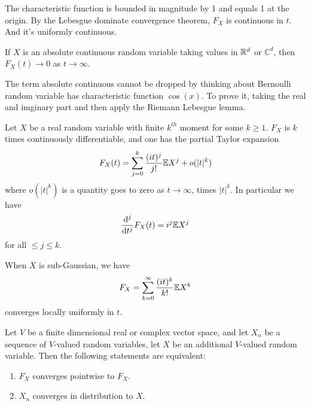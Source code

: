 The characteristic function is bounded in magnitude by 1 and equals 1 at the origin. By the Lebesgue dominate convergence theorem, $F_X$ is continuous in $t$. And it's uniformly continuous.

\begin{lemma}
    If $X$ is an absolute continuous random variable taking values in $\mathbb{R}^d$ or $\mathbb C^d$, then $F_X(t)\to 0$ as $t\to \infty$.
\end{lemma}

The term absolute continuous cannot be dropped by thinking about Bernoulli random  variable has characteristic function $\cos(x)$. To prove it, taking the real and imginary part and then apply the Riemann Lebesgue lemma. 

\begin{theorem}
    \label{taylor expansion of characteristic function}
    Let $X$ be a real random variable with finite $k^{th}$ moment for some $k\geq 1$. $F_X$ is $k$ times continuously differentiable, and one has the partial Taylor expansion
    \begin{equation*}
        F_X(t) = \sum_{j=0}^k \frac{(it)^j}{j!} \mathbb{E} X^j +o(|t|^k)
    \end{equation*}
    where $o(|t|^k)$ is a quantity goes to zero as $t\to \infty$, times $|t|^k$. In particular we have 
    \begin{equation*}
        \frac{\mathrm{d}^j}{\mathrm{d} t^j} F_X(t) = i^j \mathbb{E} X^j
    \end{equation*}
    for all $\leq j\leq k$.
\end{theorem}

When $X$ is sub-Gaussian, we have 
\begin{equation}
    F_X = \sum_{k=0}^\infty \frac{(it)^k}{k!} \mathbb{E} X^k
\end{equation}
converges locally uniformly in $t$. 

\begin{theorem}
    \label{levy continuity theorem}
    Let $V$ be a finite dimensional real or complex vector space, and let $X_n$ be a sequence of $V$-valued random variables, let $X$ be an additional $V$-valued random variable. 
    Then the following statements are equivalent:
    \begin{enumerate}
        \item $F_X$ converges pointwise to $F_X$.
        \item $X_n$ converges in distribution to $X$.
    \end{enumerate}
\end{theorem}


